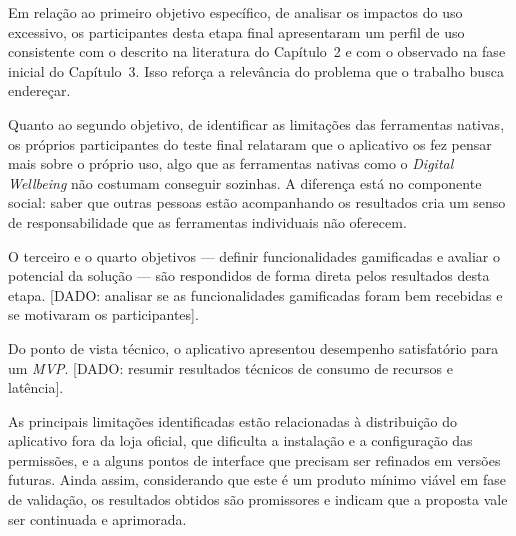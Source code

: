 Em relação ao primeiro objetivo específico, de analisar os impactos do uso excessivo, os participantes desta etapa final apresentaram um perfil de uso consistente com o descrito na literatura do Capítulo~2 e com o observado na fase inicial do Capítulo~3. Isso reforça a relevância do problema que o trabalho busca endereçar.

Quanto ao segundo objetivo, de identificar as limitações das ferramentas nativas, os próprios participantes do teste final relataram que o aplicativo os fez pensar mais sobre o próprio uso, algo que as ferramentas nativas como o \textit{Digital Wellbeing} não costumam conseguir sozinhas. A diferença está no componente social: saber que outras pessoas estão acompanhando os resultados cria um senso de responsabilidade que as ferramentas individuais não oferecem.

O terceiro e o quarto objetivos — definir funcionalidades gamificadas e avaliar o potencial da solução — são respondidos de forma direta pelos resultados desta etapa. [DADO: analisar se as funcionalidades gamificadas foram bem recebidas e se motivaram os participantes].

Do ponto de vista técnico, o aplicativo apresentou desempenho satisfatório para um \textit{MVP}. [DADO: resumir resultados técnicos de consumo de recursos e latência].

As principais limitações identificadas estão relacionadas à distribuição do aplicativo fora da loja oficial, que dificulta a instalação e a configuração das permissões, e a alguns pontos de interface que precisam ser refinados em versões futuras. Ainda assim, considerando que este é um produto mínimo viável em fase de validação, os resultados obtidos são promissores e indicam que a proposta vale ser continuada e aprimorada.

\bigskip